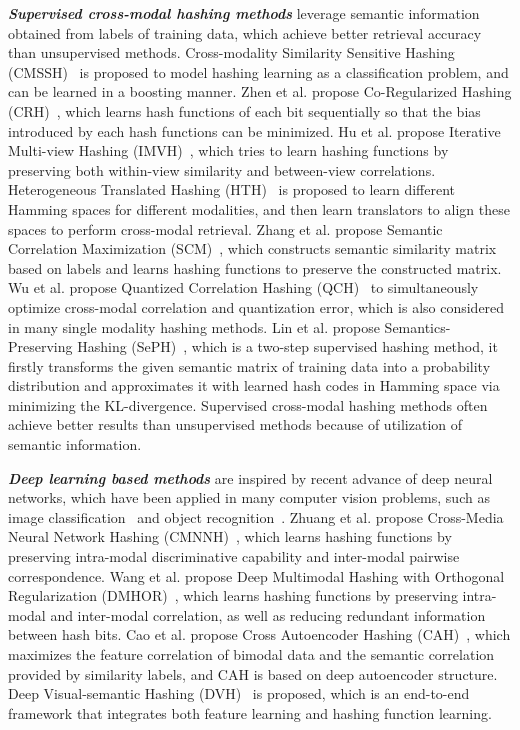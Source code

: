 \documentclass[journal]{IEEEtran}
\begin{document}
\textit{\textbf{Supervised cross-modal hashing methods}} leverage semantic information obtained from labels of training data, which achieve better retrieval accuracy than unsupervised methods. Cross-modality Similarity Sensitive Hashing (CMSSH)~\cite{CMSSH} is proposed to model hashing learning as a classification problem, and can be learned in a boosting manner. Zhen et al. propose Co-Regularized Hashing (CRH)~\cite{CRH}, which learns hash functions of each bit sequentially so that the bias introduced by each hash functions can be minimized. Hu et al. propose Iterative Multi-view Hashing (IMVH)~\cite{IMVH}, which tries to learn hashing functions by preserving both within-view similarity and between-view correlations. Heterogeneous Translated Hashing (HTH)~\cite{HTH} is proposed to learn different Hamming spaces for different modalities, and then learn translators to align these spaces to perform cross-modal retrieval. Zhang et al. propose Semantic Correlation Maximization (SCM)~\cite{SCM}, which constructs semantic similarity matrix based on labels and learns hashing functions to preserve the constructed matrix. Wu et al. propose Quantized Correlation Hashing (QCH)~\cite{QCH} to simultaneously optimize cross-modal correlation and quantization error, which is also considered in many single modality hashing methods. Lin et al. propose Semantics-Preserving Hashing (SePH)~\cite{SePH}, which is a two-step supervised hashing method, it firstly transforms the given semantic matrix of training data into a probability distribution and approximates it with learned hash codes in Hamming space via minimizing the KL-divergence. Supervised cross-modal hashing methods often achieve better results than unsupervised methods because of utilization of semantic information. 

\textit{\textbf{Deep learning based methods}} are inspired by recent advance of deep neural networks, which have been applied in many computer vision problems, such as image classification~\cite{imagelcass} and object recognition~\cite{deepobj}. Zhuang et al. propose Cross-Media Neural Network Hashing (CMNNH)~\cite{CMNNH}, which learns hashing functions by preserving intra-modal discriminative capability and inter-modal pairwise correspondence. Wang et al. propose Deep Multimodal Hashing with Orthogonal Regularization (DMHOR)~\cite{DMHOR,DMHORconf}, which learns hashing functions by preserving intra-modal and inter-modal correlation, as well as reducing redundant information between hash bits. Cao et al. propose Cross Autoencoder Hashing (CAH)~\cite{CAH}, which maximizes the feature correlation of bimodal data and the semantic correlation provided by similarity labels, and CAH is based on deep autoencoder structure. Deep Visual-semantic Hashing (DVH)~\cite{DVH} is proposed, which is an end-to-end framework that integrates both feature learning and hashing function learning.
\end{document}
